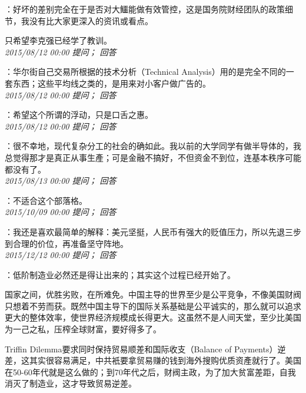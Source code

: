 \documentclass[twocolumn]{ctexart}
\begin{document}
：好坏的差别完全在于是否对大鱷能做有效管控，这是国务院财经团队的政策细节，我没有比大家更深入的资讯或看点。

只希望李克强已经学了教训。\\

\textit{\hfill\noindent\small 2015/08/12 00:00 提问； 回答}

：华尔街自己交易所根据的技术分析（Technical Analysis）用的是完全不同的一套东西；这些平均线之类的，是用来对小客户做广告的。\\

\textit{\hfill\noindent\small 2015/08/12 00:00 提问； 回答}

：希望这个所谓的浮动，只是口舌之惠。\\

\textit{\hfill\noindent\small 2015/08/12 00:00 提问； 回答}

：很不幸地，现代复杂分工的社会的确如此。我以前的大学同学有做半导体的，我总觉得那才是真正从事生產；可是金融不搞好，不但资金不到位，连基本秩序可能都没有了。\\

\textit{\hfill\noindent\small 2015/08/13 00:00 提问； 回答}

：不适合这个部落格。\\

\textit{\hfill\noindent\small 2015/10/09 00:00 提问； 回答}

：我还是喜欢最简单的解释：美元坚挺，人民币有强大的贬值压力，所以先退三步到合理的价位，再准备坚守阵地。\\

\textit{\hfill\noindent\small 2015/12/12 00:00 提问； 回答}

：低阶制造业必然还是得让出来的；其实这个过程已经开始了。

国家之间，优胜劣败，在所难免。中国主导的世界至少是公平竞争，不像美国财阀只想着不劳而获。既然中国主导下的国际关系基础是公平诚实的，那么就可以追求更大的整体效率，使世界经济规模成长得更大。这虽然不是人间天堂，至少比美国为一己之私，压榨全球财富，要好得多了。

Triffin Dilemma要求同时保持贸易顺差和国际收支（Balance of Payments）逆差，这其实很容易满足，中共衹要拿贸易赚的钱到海外搜购优质资產就行了。美国在50-60年代就是这么做的；到70年代之后，财阀主政，为了加大贫富差距，自我消灭了制造业，这才导致贸易逆差。\\
\end{document}
